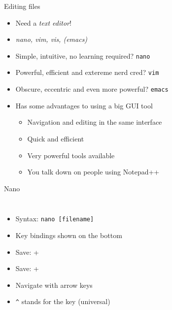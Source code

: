     \begin{frame}[t,fragile]{Editing files}
        \begin{itemize}
            \item Need a \emph{text editor}!
            \item \emph{nano, vim, vis, (emacs)}
            \item Simple, intuitive, no learning required? \textrightarrow\:\texttt{nano}
            \item Powerful, efficient and extereme nerd cred? \textrightarrow\:\texttt{vim}
            \item Obscure, eccentric and even more powerful? \textrightarrow\:\texttt{emacs}
            \item Has some advantages to using a big GUI tool
                \begin{itemize}
                    \item Navigation and editing in the same interface
                    \item Quick and efficient
                    \item Very powerful tools available
                    \item You talk down on people using Notepad++
                \end{itemize}
        \end{itemize}
    \end{frame}

    \begin{frame}[t,fragile]{Nano}
        \begin{columns}[T]
            \begin{itemize}
                \item Syntax: \texttt{nano [filename]}
                \item Key bindings shown on the bottom
                \item Save: \keys{\ctrl} + 
                \item Save: \keys{\ctrl} + 
                \item Navigate with arrow keys \keys{\arrowkeyleft}
                    \keys{\arrowkeydown} \keys{\arrowkeyup}
                    \keys{\arrowkeyright}
                \item \texttt{\textasciicircum} stands for the \keys{\ctrl} key (universal)
            \end{itemize}
        \end{columns}
    \end{frame}

